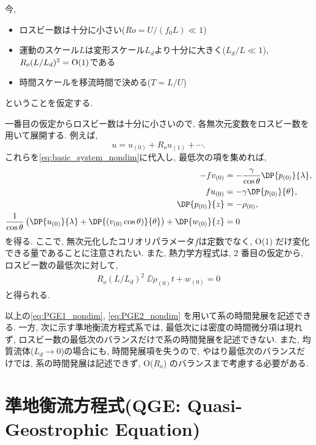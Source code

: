 今, 
\begin{itemize}
\vspace{-0.5cm}
 \item ロスビー数は十分に小さい($Ro = U/(f_0 L) \ll 1$)
 \item 運動のスケール$L$は変形スケール$L_d$より十分に大きく($L_d/L \ll 1$), 
       $R_o (L/L_d)^2 = {\rm O}(1)$である 
 \item 時間スケールを移流時間で決める($T=L/U$)  
\vspace{-0.5cm}
\end{itemize}
ということを仮定する. 

一番目の仮定からロスビー数は十分に小さいので, 
各無次元変数をロスビー数を用いて展開する. 
例えば, 
$$
 u = u_{(0)} + R_o u_{(1)} + \cdots. 
$$ 
これらを\eqref{eq:basic_system_nondim}に代入し, 最低次の項を集めれば, 
\begin{subequations} %
  \begin{align}
    - f v_{(0)}  &= - \dfrac{\gamma}{\cos \theta} \DP{p_{(0)}}{\lambda}, \\
    fu_{(0)} &= - \gamma \DP{p_{(0)}}{\theta}, \\
    \DP{p_{(0)}}{z} &= - \rho_{(0)}, \\
    \dfrac{1}{\cos \theta} \left( \DP{u_{(0)}}{\lambda} + \DP{ (v_{(0)} \cos{\theta})}{\theta} \right)  + \DP{w_{(0)}}{z} &= 0
  \end{align}
\label{eq:PGE1_nondim}
\end{subequations}
を得る. 
ここで, 無次元化したコリオリパラメータ$f$は定数でなく, O(1) だけ変化できる量であることに注意されたい. 
また, 熱力学方程式は, 2 番目の仮定から, ロスビー数の最低次に対して, 
\begin{align}
  R_o (L/L_d)^2 \;  \DD{\rho_{(0)}}{t} + w_{(0)} = 0
\label{eq:PGE2_nondim}
\end{align}
と得られる. 

以上の\eqref{eq:PGE1_nondim}, \eqref{eq:PGE2_nondim} を用いて系の時間発展を記述できる. 
一方, 次に示す準地衡流方程式系では, 最低次には密度の時間微分項は現れず, 
ロスビー数の最低次のバランスだけで系の時間発展を記述できない. 
また, 均質流体($L_d \to 0$)の場合にも, 時間発展項を失うので, やはり最低次のバランスだけでは, 
系の時間発展は記述できず, O($R_o$) のバランスまで考慮する必要がある. 

\section{準地衡流方程式(QGE: Quasi-Geostrophic Equation)}

